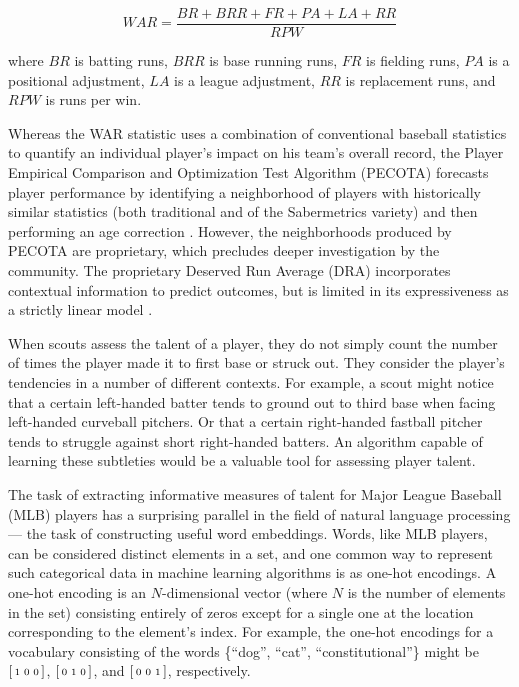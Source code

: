 \documentclass{article}
\begin{document}
\begin{equation}
\label{eqn:war}
WAR = \frac{BR + BRR + FR + PA + LA + RR}{RPW}
\end{equation}

where $BR$ is batting runs, $BRR$ is base running runs, $FR$ is fielding runs, $PA$ is a positional adjustment, $LA$ is a league adjustment, $RR$ is replacement runs, and $RPW$ is runs per win.

Whereas the WAR statistic uses a combination of conventional baseball statistics to quantify an individual player's impact on his team's overall record, the Player Empirical Comparison and Optimization Test Algorithm (PECOTA) forecasts player performance by identifying a neighborhood of players with historically similar statistics (both traditional and of the Sabermetrics variety) and then performing an age correction \parencite{PECOTA}. However, the neighborhoods produced by PECOTA are proprietary, which precludes deeper investigation by the community. The proprietary Deserved Run Average (DRA) incorporates contextual information to predict outcomes, but is limited in its expressiveness as a strictly linear model \parencite{Judge2015, Turkenkopf2015}.

When scouts assess the talent of a player, they do not simply count the number of times the player made it to first base or struck out. They consider the player's tendencies in a number of different contexts. For example, a scout might notice that a certain left-handed batter tends to ground out to third base when facing left-handed curveball pitchers. Or that a certain right-handed fastball pitcher tends to struggle against short right-handed batters. An algorithm capable of learning these subtleties would be a valuable tool for assessing player talent.

The task of extracting informative measures of talent for Major League Baseball (MLB) players has a surprising parallel in the field of natural language processing --- the task of constructing useful word embeddings. Words, like MLB players, can be considered distinct elements in a set, and one common way to represent such categorical data in machine learning algorithms is as one-hot encodings. A one-hot encoding is an $N$-dimensional vector (where $N$ is the number of elements in the set) consisting entirely of zeros except for a single one at the location corresponding to the element's index. For example, the one-hot encodings for a vocabulary consisting of the words \{``dog'', ``cat'', ``constitutional''\} might be $\begin{bsmallmatrix} 1 & 0 & 0 \end{bsmallmatrix}$, $\begin{bsmallmatrix} 0 & 1 & 0 \end{bsmallmatrix}$, and $\begin{bsmallmatrix} 0 & 0 & 1 \end{bsmallmatrix}$, respectively.
\end{document}
